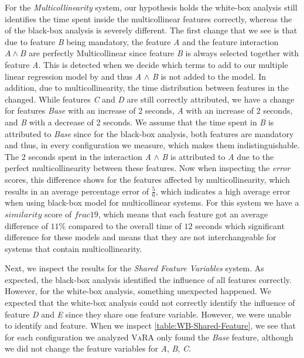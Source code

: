 For the \emph{Multicollinearity} system, our hypothesis holds the white-box analysis still identifies the time spent inside the multicollinear features correctly, whereas the {\perfInfluenceModel} of the black-box analysis is severely different. The first change that we see is that due to feature \emph{B} being mandatory, the feature \emph{A} and the feature interaction $A \land B$ are perfectly Multicollinear since feature \emph{B} 
is always selected together with feature \emph{A}. 
This is detected when we decide which terms to add to our multiple linear regression model by  
and thus \emph{A} $\land$ \emph{B} is not added to the model. In addition, due to multicollinearity, the time distribution between features in the 
{\perfInfluenceModel} changed. While features \emph{C} and \emph{D} are still correctly attributed, 
we have a change for features \emph{Base} with an increase of 2 seconds, \emph{A} with an increase of 2 seconds, 
and \emph{B} with a decrease of 2 seconds.
We assume that the time spent in \emph{B} is attributed to \emph{Base} since for the black-box analysis, both features are mandatory and
thus, in every configuration we measure, which makes them indistinguishable. 
The 2 seconds spent in the interaction \emph{A} $\land$ \emph{B} is attributed to \emph{A} due to the perfect multicollinearity 
between these features. 
Now when inspecting the \emph{error} scores, this difference shows for the features affected by multicollinearity, 
which results in an average percentage error of $\frac{5}{6}$, 
which indicates a high average error when using black-box model for multicollinear systems.
For this system we have a $\overline{similarity}$ score of $frac{1}{9}$, which means that each feature got an average 
difference of $11\%$ compared to the overall time of $12$ seconds which significant difference for these models and 
means that they are not interchangeable for systems that contain multicollinearity.

Next, we inspect the results for the \emph{Shared Feature Variables} system. 
As expected, the black-box analysis identified the influence of all features correctly. 
However, for the white-box analysis, something unexpected happened. 
We expected that the white-box analysis could not correctly identify the influence of feature \emph{D} and \emph{E} since they share one 
feature variable. However, we were unable to identify and feature. When we inspect \autoref{table:WB-Shared-Feature}, 
we see that for each configuration we analyzed \textsc{VaRA} only found the \emph{Base} feature, 
although we did not change the feature variables for \emph{A}, \emph{B}, \emph{C}.

